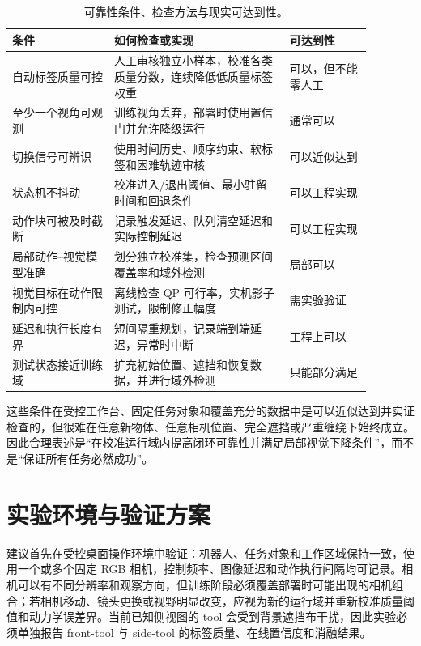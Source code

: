 \documentclass[UTF8,a4paper,11pt]{ctexart}
\begin{document}
\begin{table}[htbp]
  \centering
  \small
  \begin{tabular}{p{0.25\linewidth}p{0.43\linewidth}p{0.20\linewidth}}
    \toprule
    条件 & 如何检查或实现 & 可达到性 \\
    \midrule
    自动标签质量可控 & 人工审核独立小样本，校准各类质量分数，连续降低低质量标签权重 & 可以，但不能零人工 \\
    至少一个视角可观测 & 训练视角丢弃，部署时使用置信门并允许降级运行 & 通常可以 \\
    切换信号可辨识 & 使用时间历史、顺序约束、软标签和困难轨迹审核 & 可以近似达到 \\
    状态机不抖动 & 校准进入/退出阈值、最小驻留时间和回退条件 & 可以工程实现 \\
    动作块可被及时截断 & 记录触发延迟、队列清空延迟和实际控制延迟 & 可以工程实现 \\
    局部动作--视觉模型准确 & 划分独立校准集，检查预测区间覆盖率和域外检测 & 局部可以 \\
    视觉目标在动作限制内可控 & 离线检查 QP 可行率，实机影子测试，限制修正幅度 & 需实验验证 \\
    延迟和执行长度有界 & 短间隔重规划，记录端到端延迟，异常时中断 & 工程上可以 \\
    测试状态接近训练域 & 扩充初始位置、遮挡和恢复数据，并进行域外检测 & 只能部分满足 \\
    \bottomrule
  \end{tabular}
  \caption{可靠性条件、检查方法与现实可达到性。}
\end{table}

这些条件在受控工作台、固定任务对象和覆盖充分的数据中是可以近似达到并实证检查的，但很难在任意新物体、任意相机位置、完全遮挡或严重缠绕下始终成立。因此合理表述是“在校准运行域内提高闭环可靠性并满足局部视觉下降条件”，而不是“保证所有任务必然成功”。

\section{实验环境与验证方案}

建议首先在受控桌面操作环境中验证：机器人、任务对象和工作区域保持一致，使用一个或多个固定 RGB 相机，控制频率、图像延迟和动作执行间隔均可记录。相机可以有不同分辨率和观察方向，但训练阶段必须覆盖部署时可能出现的相机组合；若相机移动、镜头更换或视野明显改变，应视为新的运行域并重新校准质量阈值和动力学误差界。当前已知侧视图的 tool 会受到背景遮挡布干扰，因此实验必须单独报告 front-tool 与 side-tool 的标签质量、在线置信度和消融结果。
\end{document}
